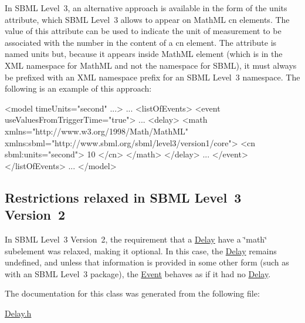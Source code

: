 In S\+B\+ML Level~3, an alternative approach is available in the form of the {\ttfamily units} attribute, which S\+B\+ML Level~3 allows to appear on Math\+ML {\ttfamily cn} elements. The value of this attribute can be used to indicate the unit of measurement to be associated with the number in the content of a {\ttfamily cn} element. The attribute is named {\ttfamily units} but, because it appears inside Math\+ML element (which is in the X\+ML namespace for Math\+ML and not the namespace for S\+B\+ML), it must always be prefixed with an X\+ML namespace prefix for an S\+B\+ML Level~3 namespace. The following is an example of this approach\+: \begin{DoxyVerb}<model timeUnits="second" ...>
    ...
    <listOfEvents>
        <event useValuesFromTriggerTime="true">
            ...
            <delay>
                <math xmlns="http://www.w3.org/1998/Math/MathML"
                      xmlns:sbml="http://www.sbml.org/sbml/level3/version1/core">
                    <cn sbml:units="second"> 10 </cn>
                </math>
            </delay>
            ...
        </event>
    </listOfEvents>
    ...
</model>
\end{DoxyVerb}
\hypertarget{class_delay_delay-restrictions}{}\subsection{Restrictions relaxed in S\+B\+M\+L Level 3 Version 2}\label{class_delay_delay-restrictions}
In S\+B\+ML Level~3 Version~2, the requirement that a \hyperlink{class_delay}{Delay} have a \char`\"{}math\char`\"{} subelement was relaxed, making it optional. In this case, the \hyperlink{class_delay}{Delay} remains undefined, and unless that information is provided in some other form (such as with an S\+B\+ML Level~3 package), the \hyperlink{class_event}{Event} behaves as if it had no \hyperlink{class_delay}{Delay}. 

The documentation for this class was generated from the following file\+:\begin{DoxyCompactItemize}
\item 
\hyperlink{_delay_8h}{Delay.\+h}\end{DoxyCompactItemize}
